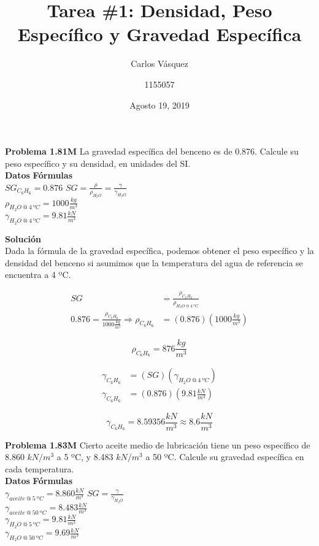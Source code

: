 \documentclass[12pt, letterpaper]{article}
\title{Tarea \#1: Densidad, Peso Específico y Gravedad Específica}
\author{Carlos Vásquez \and 1155057}
\date{Agosto 19, 2019}
\begin{document}
\maketitle

\textbf{Problema 1.81M} La gravedad específica del benceno es de 0.876. Calcule su peso específico y su densidad, en unidades del SI. \\
\textbf{Datos} \hspace{5cm} \textbf{Fórmulas} \\
$SG_{C_6H_6} = 0.876$ \hspace{3.3cm} $SG = \frac{\rho}{\rho_{H_2O}} = \frac{\gamma}{\gamma_{H_2O}}$\\
$\rho_{H_2O\ @\ 4\ ºC} = 1000 \frac{kg}{m^3}$\\
$\gamma_{H_2O\ @\ 4\ ºC} = 9.81 \frac{kN}{m^3}$


\textbf{Solución} \\
Dada la fórmula de la gravedad específica, podemos obtener el peso específico y la densidad del benceno si asumimos que la temperatura del agua de referencia se encuentra a 4 ºC.

\begin{equation*}
	\begin{split}
		SG &= \frac{\rho_{C_6H_6}}{\rho_{H_2O\ @\ 4\ ºC}}\\
		0.876 = \frac{\rho_{C_6H_6}}{1000\frac{kg}{m^3}} \Rightarrow \rho_{C_6H_6} &= (0.876)(1000 \frac{kg}{m^3})
	\end{split}
\end{equation*}

\begin{equation}
	\boxed{
		\rho_{C_6H_6} = 876 \frac{kg}{m^3}}
\end{equation}

\begin{equation*}
	\begin{split}
		\gamma_{C_6H_6} &= (SG)(\gamma_{H_2O\ @\ 4\ ºC})\\
		\gamma_{C_6H_6} &= (0.876)(9.81 \frac{kN}{m^3})
	\end{split}
\end{equation*}

\begin{equation}
	\boxed{
		\gamma_{C_6H_6} = 8.59356 \frac{kN}{m^3} \approx 8.6 \frac{kN}{m^3}}
\end{equation}


\textbf{Problema 1.83M} Cierto aceite medio de lubricación tiene un peso específico de 8.860 $kN/m^3$ a 5 ºC, y 8.483 $kN/m^3$ a 50 ºC. Calcule su gravedad específica en cada temperatura. \\
\textbf{Datos} \hspace{5cm} \textbf{Fórmulas} \\
$\gamma_{aceite\ @\ 5\ ºC} = 8.860 \frac{kN}{m^3}$ \hspace{1.8cm} $SG = \frac{\gamma}{\gamma_{H_2O}}$\\
$\gamma_{aceite\ @\ 50\ ºC} = 8.483 \frac{kN}{m^3}$\\
$\gamma_{H_2O\ @\ 5\ ºC} = 9.81 \frac{kN}{m^3}$\\
$\gamma_{H_2O\ @\ 50\ ºC} = 9.69 \frac{kN}{m^3}$
\end{document}
